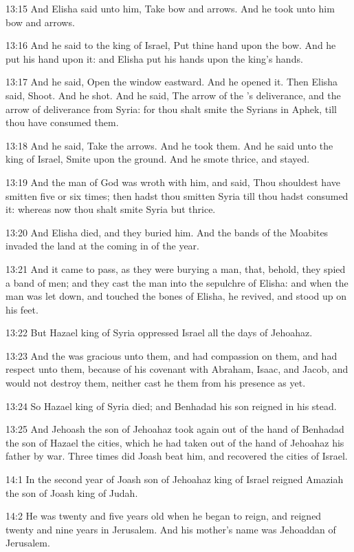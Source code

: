 13:15 And Elisha said unto him, Take bow and arrows. And he took unto him bow and arrows.

13:16 And he said to the king of Israel, Put thine hand upon the bow.  And he put his hand upon it: and Elisha put his hands upon the king's hands.

13:17 And he said, Open the window eastward. And he opened it. Then Elisha said, Shoot. And he shot. And he said, The arrow of the \LORD's deliverance, and the arrow of deliverance from Syria: for thou shalt smite the Syrians in Aphek, till thou have consumed them.

13:18 And he said, Take the arrows. And he took them. And he said unto the king of Israel, Smite upon the ground. And he smote thrice, and stayed.

13:19 And the man of God was wroth with him, and said, Thou shouldest have smitten five or six times; then hadst thou smitten Syria till thou hadst consumed it: whereas now thou shalt smite Syria but thrice.

13:20 And Elisha died, and they buried him. And the bands of the Moabites invaded the land at the coming in of the year.

13:21 And it came to pass, as they were burying a man, that, behold, they spied a band of men; and they cast the man into the sepulchre of Elisha: and when the man was let down, and touched the bones of Elisha, he revived, and stood up on his feet.

13:22 But Hazael king of Syria oppressed Israel all the days of Jehoahaz.

13:23 And the \LORD was gracious unto them, and had compassion on them, and had respect unto them, because of his covenant with Abraham, Isaac, and Jacob, and would not destroy them, neither cast he them from his presence as yet.

13:24 So Hazael king of Syria died; and Benhadad his son reigned in his stead.

13:25 And Jehoash the son of Jehoahaz took again out of the hand of Benhadad the son of Hazael the cities, which he had taken out of the hand of Jehoahaz his father by war. Three times did Joash beat him, and recovered the cities of Israel.

14:1 In the second year of Joash son of Jehoahaz king of Israel reigned Amaziah the son of Joash king of Judah.

14:2 He was twenty and five years old when he began to reign, and reigned twenty and nine years in Jerusalem. And his mother's name was Jehoaddan of Jerusalem.


